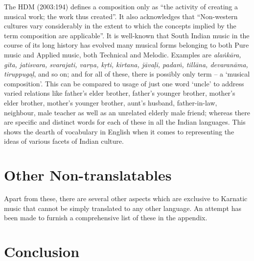 The HDM (2003:194) defines a composition only as “the activity of creating a musical work; the work thus created”. It also acknowledges that “Non-western cultures vary considerably in the extent to which the concepts implied by the term composition are applicable”. It is well-known that South Indian music in the course of its long history has evolved many musical forms belonging to both Pure music and Applied music, both Technical and Melodic. Examples are \textit{alaṅkāra, gīta, jatisvara, svarajati, varṇa, kṛti, kīrtana, jāvaḷi, padaṁ, tillāna, devaranāma, tiruppugaḻ}, and so on; and for all of these, there is possibly only term – a ‘musical composition’. This can be compared to usage of just one word ‘uncle’ to address varied relations like father’s elder brother, father’s younger brother, mother’s elder brother, mother’s younger brother, aunt’s husband, father-in-law, neighbour, male teacher as well as an unrelated elderly male friend; whereas there are specific and distinct words for each of these in all the Indian languages. This shows the dearth of vocabulary in English when it comes to representing the ideas of various facets of Indian culture.


\section*{Other Non-translatables}

Apart from these, there are several other aspects which are exclusive to Karnatic music that cannot be simply translated to any other language. An attempt has been made to furnish a comprehensive list of these in the appendix.


\section*{Conclusion}

